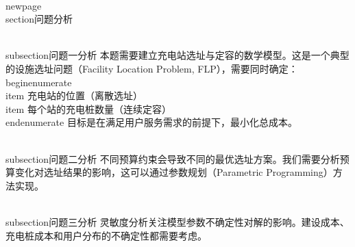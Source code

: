 \\newpage
\\section{问题分析}

\\subsection{问题一分析}
本题需要建立充电站选址与定容的数学模型。这是一个典型的设施选址问题（Facility Location Problem, FLP），需要同时确定：
\\begin{enumerate}
    \\item 充电站的位置（离散选址）
    \\item 每个站的充电桩数量（连续定容）
\\end{enumerate}
目标是在满足用户服务需求的前提下，最小化总成本。

\\subsection{问题二分析}
不同预算约束会导致不同的最优选址方案。我们需要分析预算变化对选址结果的影响，这可以通过参数规划（Parametric Programming）方法实现。

\\subsection{问题三分析}
灵敏度分析关注模型参数不确定性对解的影响。建设成本、充电桩成本和用户分布的不确定性都需要考虑。
